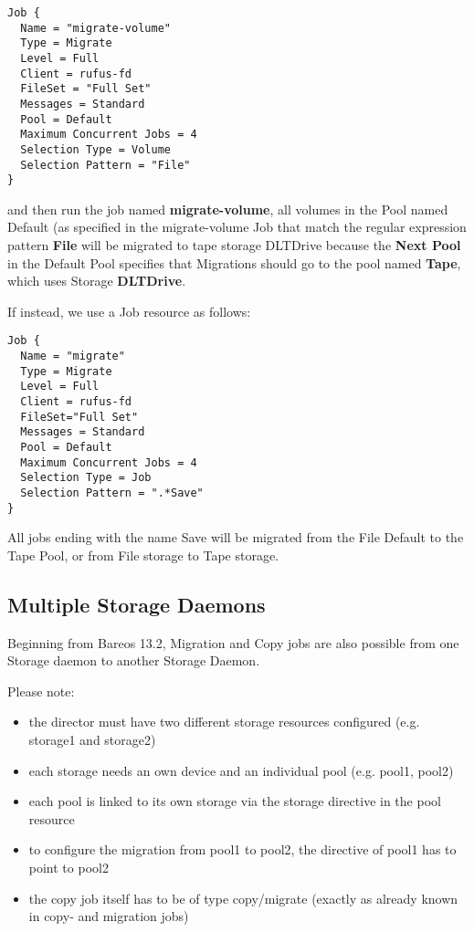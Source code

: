 \footnotesize
\begin{verbatim}
Job {
  Name = "migrate-volume"
  Type = Migrate
  Level = Full
  Client = rufus-fd
  FileSet = "Full Set"
  Messages = Standard
  Pool = Default
  Maximum Concurrent Jobs = 4
  Selection Type = Volume
  Selection Pattern = "File"
}
\end{verbatim}
\normalsize

and then run the job named {\bf migrate-volume}, all volumes in the Pool
named Default (as specified in the migrate-volume Job that match the
regular expression pattern {\bf File} will be migrated to tape storage
DLTDrive because the {\bf Next Pool} in the Default Pool specifies that
Migrations should go to the pool named {\bf Tape}, which uses
Storage {\bf DLTDrive}.

If instead, we use a Job resource as follows:

\footnotesize
\begin{verbatim}
Job {
  Name = "migrate"
  Type = Migrate
  Level = Full
  Client = rufus-fd
  FileSet="Full Set"
  Messages = Standard
  Pool = Default
  Maximum Concurrent Jobs = 4
  Selection Type = Job
  Selection Pattern = ".*Save"
}
\end{verbatim}
\normalsize

All jobs ending with the name Save will be migrated from the File Default to
the Tape Pool, or from File storage to Tape storage.

\subsection{Multiple Storage Daemons}

Beginning from Bareos 13.2, Migration and Copy jobs are also possible from one Storage daemon to another Storage Daemon.

Please note:
\begin{itemize}
 \item the director must have two different storage resources configured (e.g. storage1 and storage2)
    \item each storage needs an own device and an individual pool (e.g. pool1, pool2)
    \item each pool is linked to its own storage via the storage directive in the pool resource
    \item to configure the migration from pool1 to pool2, the  directive of pool1 has to point to pool2
    \item the copy job itself has to be of type copy/migrate (exactly as already known in copy- and migration jobs)
\end{itemize}


